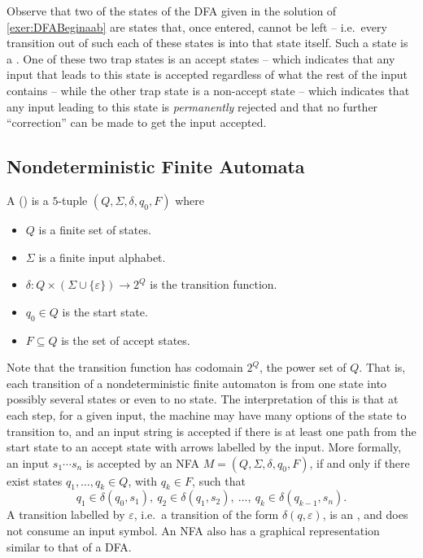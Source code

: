 Observe that two of the states of the DFA given in the solution of \cref{exer:DFABeginaab} are states that, once entered, cannot be left -- i.e.\ every transition out of such each of these states is into that state itself. Such a state is a . One of these two trap states is an accept states -- which indicates that any input that leads to this state is accepted regardless of what the rest of the input contains -- while the other trap state is a non-accept state -- which indicates that any input leading to this state is \emph{permanently} rejected and that no further ``correction'' can be made to get the input accepted.

\subsection{Nondeterministic Finite Automata}\label{subsec:NFA}

A  () is a $5$-tuple $(Q, \Sigma, \delta, q_0, F)$ where
\begin{itemize}
\item $Q$ is a finite set of states.
\item $\Sigma$ is a finite input alphabet.
\item $\delta \colon Q \times (\Sigma \cup \{\varepsilon\}) \to 2^Q$ is the transition function.
\item $q_0 \in Q$ is the start state.
\item $F \subseteq Q$ is the set of accept states.
\end{itemize}

Note that the transition function has codomain $2^Q$, the power set of $Q$. That is, each transition of a nondeterministic finite automaton is from one state into possibly several states or even to no state. The interpretation of this is that at each step, for a given input, the machine may have many options of the state to transition to, and an input string is accepted if there is at least one path from the start state to an accept state with arrows labelled by the input. More formally, an input $s_1 \cdots s_n$ is accepted by an NFA $M = (Q, \Sigma, \delta, q_0, F)$, if and only if there exist states $q_1, \ldots, q_k \in Q$, with $q_k \in F$, such that
\begin{equation*}
q_1 \in \delta(q_0, s_1),~ q_2 \in \delta(q_1, s_2),~ \ldots,~ q_k \in \delta(q_{k-1}, s_n).
\end{equation*}
A transition labelled by $\varepsilon$, i.e.\ a transition of the form $\delta(q, \varepsilon)$, is an , and does not consume an input symbol. An NFA also has a graphical representation similar to that of a DFA.


